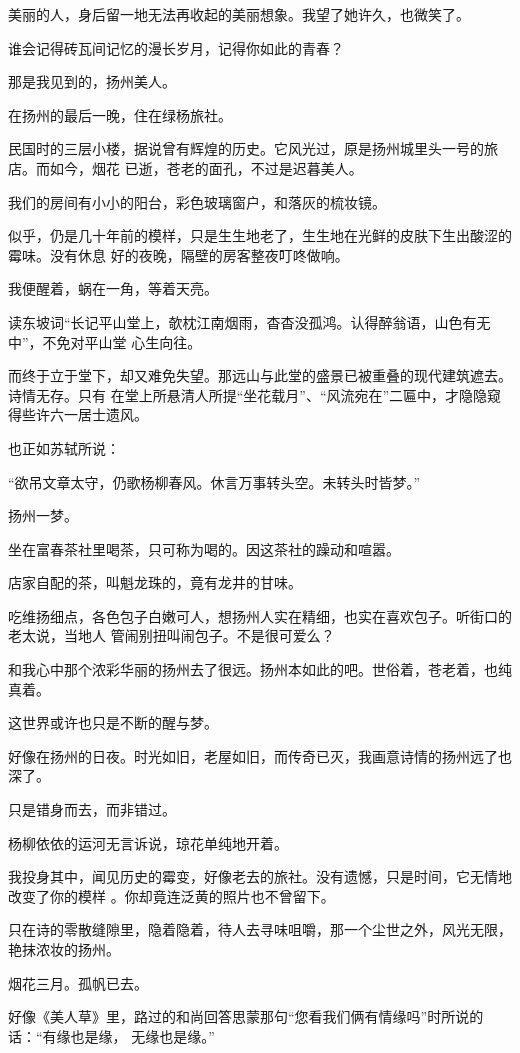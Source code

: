 \documentclass[12pt,a4paper]{article}
\begin{document}
		美丽的人，身后留一地无法再收起的美丽想象。我望了她许久，也微笑了。

		谁会记得砖瓦间记忆的漫长岁月，记得你如此的青春？

		那是我见到的，扬州美人。

		在扬州的最后一晚，住在绿杨旅社。

		民国时的三层小楼，据说曾有辉煌的历史。它风光过，原是扬州城里头一号的旅店。而如今，烟花
	已逝，苍老的面孔，不过是迟暮美人。

		我们的房间有小小的阳台，彩色玻璃窗户，和落灰的梳妆镜。

		似乎，仍是几十年前的模样，只是生生地老了，生生地在光鲜的皮肤下生出酸涩的霉味。没有休息
	好的夜晚，隔壁的房客整夜叮咚做响。

		我便醒着，蜗在一角，等着天亮。

		读东坡词“长记平山堂上，欹枕江南烟雨，杳杳没孤鸿。认得醉翁语，山色有无中”，不免对平山堂
	心生向往。

		而终于立于堂下，却又难免失望。那远山与此堂的盛景已被重叠的现代建筑遮去。诗情无存。只有
	在堂上所悬清人所提“坐花载月”、“风流宛在”二匾中，才隐隐窥得些许六一居士遗风。

		也正如苏轼所说：

		“欲吊文章太守，仍歌杨柳春风。休言万事转头空。未转头时皆梦。”

		扬州一梦。

		坐在富春茶社里喝茶，只可称为喝的。因这茶社的躁动和喧嚣。

		店家自配的茶，叫魁龙珠的，竟有龙井的甘味。

		吃维扬细点，各色包子白嫩可人，想扬州人实在精细，也实在喜欢包子。听街口的老太说，当地人
	管闹别扭叫闹包子。不是很可爱么？

		和我心中那个浓彩华丽的扬州去了很远。扬州本如此的吧。世俗着，苍老着，也纯真着。

		这世界或许也只是不断的醒与梦。

		好像在扬州的日夜。时光如旧，老屋如旧，而传奇已灭，我画意诗情的扬州远了也深了。

		只是错身而去，而非错过。

		杨柳依依的运河无言诉说，琼花单纯地开着。

		我投身其中，闻见历史的霉变，好像老去的旅社。没有遗憾，只是时间，它无情地改变了你的模样
	。你却竟连泛黄的照片也不曾留下。

		只在诗的零散缝隙里，隐着隐着，待人去寻味咀嚼，那一个尘世之外，风光无限，艳抹浓妆的扬州。

		烟花三月。孤帆已去。

		好像《美人草》里，路过的和尚回答思蒙那句“您看我们俩有情缘吗”时所说的话：“有缘也是缘，
	无缘也是缘。”
\end{document}
